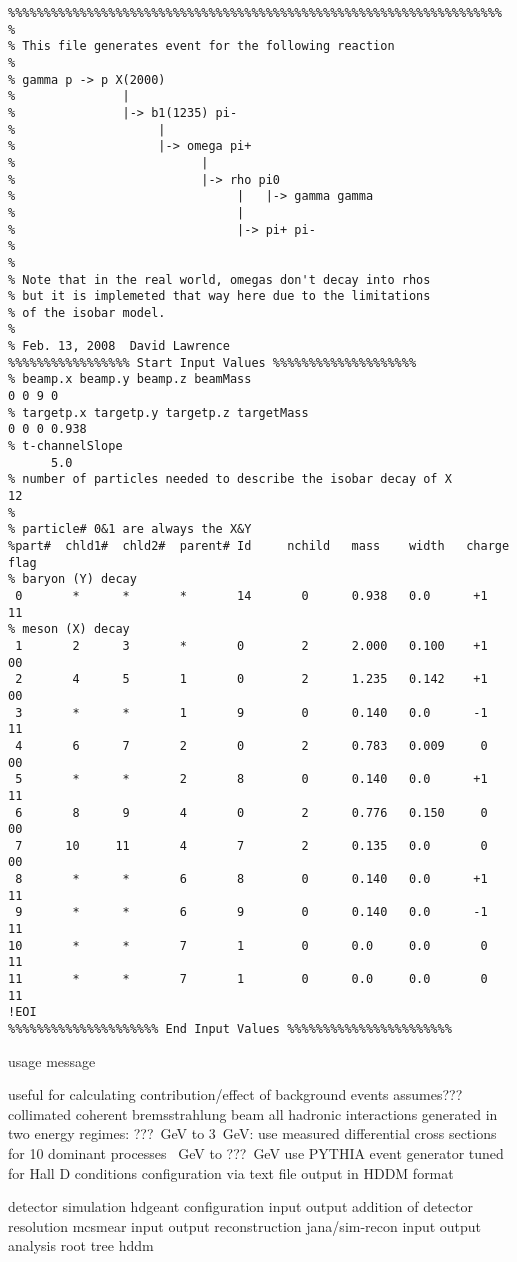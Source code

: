 \begin{verbatim}
%%%%%%%%%%%%%%%%%%%%%%%%%%%%%%%%%%%%%%%%%%%%%%%%%%%%%%%%%%%%%%%%%%%%%
%
% This file generates event for the following reaction
%
% gamma p -> p X(2000)
%               |
%               |-> b1(1235) pi-
%                    |
%                    |-> omega pi+
%                          |
%                          |-> rho pi0
%                               |   |-> gamma gamma
%                               |
%                               |-> pi+ pi-
%
%
% Note that in the real world, omegas don't decay into rhos
% but it is implemeted that way here due to the limitations
% of the isobar model.
%
% Feb. 13, 2008  David Lawrence
%%%%%%%%%%%%%%%%% Start Input Values %%%%%%%%%%%%%%%%%%%%
% beamp.x beamp.y beamp.z beamMass  
0 0 9 0
% targetp.x targetp.y targetp.z targetMass
0 0 0 0.938
% t-channelSlope
      5.0
% number of particles needed to describe the isobar decay of X
12
%   
% particle# 0&1 are always the X&Y 
%part#  chld1#  chld2#  parent# Id     nchild   mass    width   charge  flag
% baryon (Y) decay
 0       *      *       *       14       0      0.938   0.0      +1      11  
% meson (X) decay
 1       2      3       *       0        2      2.000   0.100    +1      00
 2       4      5       1       0        2      1.235   0.142    +1      00
 3       *      *       1       9        0      0.140   0.0      -1      11
 4       6      7       2       0        2      0.783   0.009     0      00
 5       *      *       2       8        0      0.140   0.0      +1      11
 6       8      9       4       0        2      0.776   0.150     0      00
 7      10     11       4       7        2      0.135   0.0       0      00
 8       *      *       6       8        0      0.140   0.0      +1      11
 9       *      *       6       9        0      0.140   0.0      -1      11
10       *      *       7       1        0      0.0     0.0       0      11
11       *      *       7       1        0      0.0     0.0       0      11
!EOI
%%%%%%%%%%%%%%%%%%%%% End Input Values %%%%%%%%%%%%%%%%%%%%%%%
\end{verbatim}


\I usage message


\I useful for calculating contribution/effect of background events
\I assumes??? collimated coherent bremsstrahlung beam
\I all hadronic interactions generated in two energy regimes:
  \I ???~GeV to 3~GeV: use measured differential cross sections for 10 dominant processes
  ~GeV to ???~GeV use PYTHIA event generator tuned for Hall D conditions
\I configuration via text file
\I output in HDDM format

detector simulation
  hdgeant
    configuration
    input
    output
addition of detector resolution
  mcsmear
    input
    output
reconstruction
  jana/sim-recon
    input
    output 
analysis
  root tree
hddm
